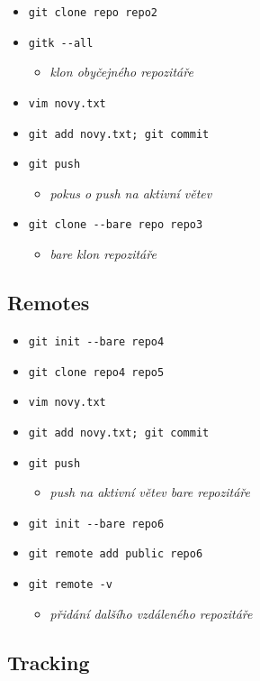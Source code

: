 \documentclass[10pt,twocolumn]{article}
\begin{document}
\begin{itemize}
	\item \texttt{git clone repo repo2}
	\item \texttt{gitk {-}{-}all}
	\begin{itemize} \item \textit{klon obyčejného repozitáře} \end{itemize}
	\item \texttt{vim novy.txt}
	\item \texttt{git add novy.txt; git commit}
	\item \texttt{git push}
	\begin{itemize} \item \textit{pokus o push na aktivní větev} \end{itemize}
	\item \texttt{git clone {-}{-}bare repo repo3}
	\begin{itemize} \item \textit{bare klon repozitáře} \end{itemize}
\end{itemize}

\subsection{Remotes}

\begin{itemize}
	\item \texttt{git init {-}{-}bare repo4}
	\item \texttt{git clone repo4 repo5}
	\item \texttt{vim novy.txt}
	\item \texttt{git add novy.txt; git commit}
	\item \texttt{git push}
	\begin{itemize} \item \textit{push na aktivní větev bare repozitáře} \end{itemize}
	\item \texttt{git init {-}{-}bare repo6}
	\item \texttt{git remote add public repo6}
	\item \texttt{git remote -v}
	\begin{itemize} \item \textit{přidání dalšího vzdáleného repozitáře} \end{itemize}
\end{itemize}

\subsection{Tracking}
\end{document}
